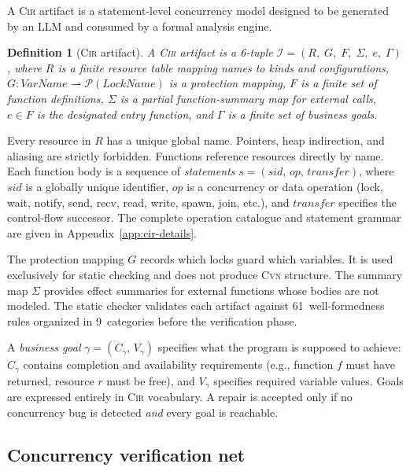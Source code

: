 \documentclass{article}
\newtheorem{definition}{Definition}
\begin{document}
A \textsc{Cir} artifact is a statement-level concurrency model designed to be generated by an LLM and consumed by a formal analysis engine.

\begin{definition}[\textsc{Cir} artifact]
\label{def:cir}
A \textsc{Cir} artifact is a 6-tuple $\mathcal{I}=(R,\;G,\;F,\;\Sigma,\;e,\;\Gamma)$, where $R$ is a finite resource table mapping names to kinds and
configurations, $G:\mathit{VarName}\rightharpoonup\mathcal{P}(\mathit{LockName})$ is a protection mapping, $F$ is a finite set of function definitions, $\Sigma$ is a partial function-summary map for external calls, $e\in F$ is the designated entry function, and $\Gamma$ is a finite set of business goals.
\end{definition}

Every resource in $R$ has a unique global name. Pointers, heap indirection, and aliasing are strictly forbidden. Functions reference resources directly by name.  Each function body is a sequence of \emph{statements} $s=(\mathit{sid},\,\mathit{op},\,\mathit{transfer})$, where $\mathit{sid}$ is a globally unique identifier, $\mathit{op}$ is a concurrency or data operation (lock, wait, notify, send, recv, read, write, spawn, join, etc.), and $\mathit{transfer}$ specifies the control-flow successor. The complete operation catalogue and statement grammar are given in Appendix~\ref{app:cir-details}.

The protection mapping $G$ records which locks guard which variables. It is used exclusively for static checking and does not produce \textsc{Cvn} structure.  The summary map $\Sigma$ provides effect summaries for external functions whose bodies are not modeled. The static checker validates each artifact against 61~well-formedness rules organized in 9~categories before the verification phase.

A \emph{business goal} $\gamma=(C_\gamma,\,V_\gamma)$ specifies what the program is supposed to achieve: $C_\gamma$ contains completion and availability requirements (e.g., function $f$ must have returned, resource $r$ must be free), and $V_\gamma$ specifies required variable values. Goals are expressed entirely in \textsc{Cir} vocabulary. A repair is accepted only if no concurrency bug is detected \emph{and} every goal is reachable.

\subsection{Concurrency verification net}
\label{subsec:cvn-def}
\end{document}
